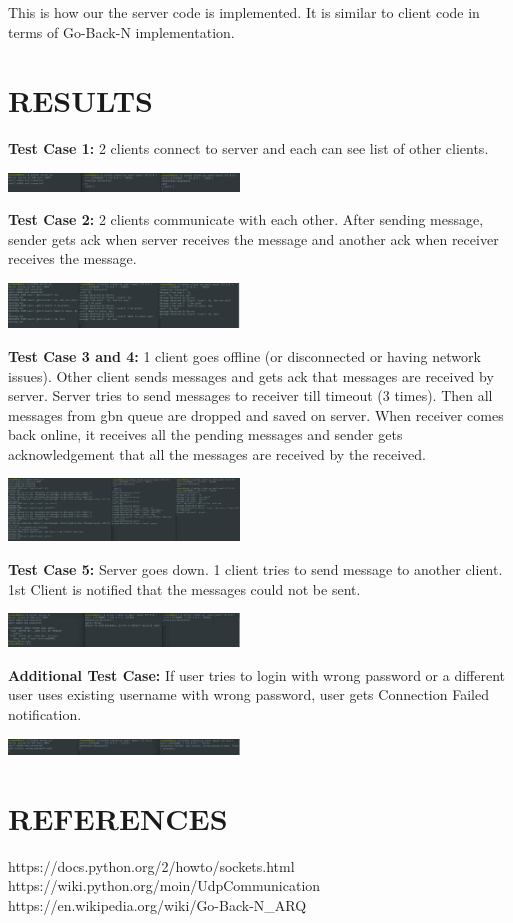 \documentclass[10pt, pdftex, twocolumn]{report}
\begin{document}
	This is how our the server code is implemented. It is similar to client code in terms of Go-Back-N implementation.
	
	
	
	\section*{RESULTS}
	\textbf{Test Case 1:} 2 clients connect to server and each can see list of other clients.
	
	\includegraphics*[width=0.46\textwidth]{list.png}
	
	
	\textbf{Test Case 2:} 2 clients communicate with each other. After sending message, sender gets ack when server receives the message and another ack when receiver receives the message.
	
	\includegraphics*[width=0.46\textwidth]{comm.png}
	
	
	\textbf{Test Case 3 and 4:} 1 client goes offline (or disconnected or having network issues). Other client sends messages and gets ack that messages are received by server. Server tries to send messages to receiver till timeout (3 times). Then all messages from gbn queue are dropped and saved on server. When receiver comes back online, it receives all the pending messages and sender gets acknowledgement that all the messages are received by the received.
	
	\includegraphics*[width=0.46\textwidth]{offline_chat.png}
	
	
	\textbf{Test Case 5:} Server goes down. 1 client tries to send message to another client. 1st Client is notified that the messages could not be sent.
	
	\includegraphics*[width=0.46\textwidth]{server-down.png}
	
	
	\textbf{Additional Test Case:} If user tries to login with wrong password or a different user uses existing username with wrong password, user gets Connection Failed notification.
	
	\includegraphics*[width=0.46\textwidth]{same-user.png}
	
	
	\section*{REFERENCES}
	https://docs.python.org/2/howto/sockets.html
	https://wiki.python.org/moin/UdpCommunication
	https://en.wikipedia.org/wiki/Go-Back-N\_ARQ
	
	
\end{document}
